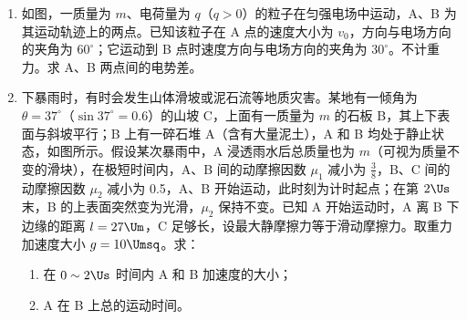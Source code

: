\documentclass[\gkver]{gaokaozhenti}
\begin{document}
\begin{enumerate}
\item
如图，一质量为 $m$、电荷量为 $q$（$q>0$）的粒子在匀强电场中运动，A、B 为其运动轨迹上的两点。已知该粒子在 A 点的速度大小为 $v_{0}$，方向与电场方向的夹角为 $60^\circ$；它运动到 B 点时速度方向与电场方向的夹角为 $30^\circ$。不计重力。求 A、B 两点间的电势差。



\item
下暴雨时，有时会发生山体滑坡或泥石流等地质灾害。某地有一倾角为 $\theta=37^\circ$（$\sin37^\circ=0.6$）的山坡 C，上面有一质量为 $m$ 的石板 B，其上下表面与斜坡平行；B 上有一碎石堆 A（含有大量泥土），A 和 B 均处于静止状态，如图所示。假设某次暴雨中，A 浸透雨水后总质量也为 $m$（可视为质量不变的滑块），在极短时间内，A、B 间的动摩擦因数 $\mu_{1}$ 减小为 $\frac{3}{8}$，B、C 间的动摩擦因数 $\mu_{2}$ 减小为 0.5，A、B 开始运动，此时刻为计时起点；在第 $2\Us$ 末，B 的上表面突然变为光滑，$\mu_{2}$ 保持不变。已知 A 开始运动时，A 离 B 下边缘的距离 $l=27\Um$，C 足够长，设最大静摩擦力等于滑动摩擦力。取重力加速度大小 $g=10\Umsq$。求：

\begin{enumerate}
	\item
	在 $0\sim2\Us$ 时间内 A 和 B 加速度的大小；

	\item
	A 在 B 上总的运动时间。
\end{enumerate}


\end{enumerate}
\end{document}
